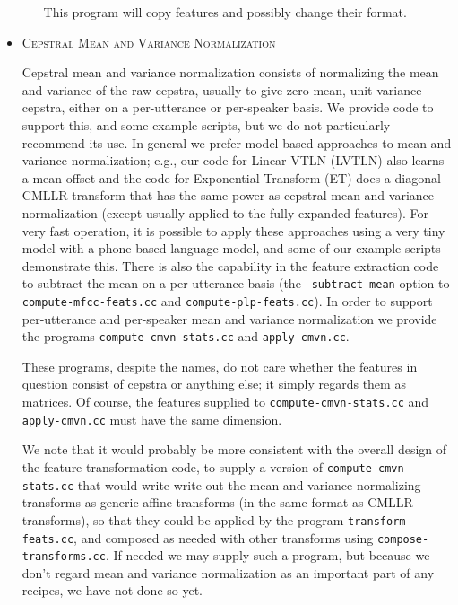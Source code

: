 \documentclass[10pt,a4paper]{article}
\begin{document}
\begin{itemize}
\begin{itemize}
    This program will copy features and possibly change their format.

  \end{itemize}

\vspace{1cm}
\item \textsc{Cepstral Mean and Variance Normalization}

    Cepstral mean and variance normalization consists of normalizing the mean and variance of the raw cepstra, usually to give zero-mean, unit-variance cepstra, either on a per-utterance or per-speaker basis. We provide code to support this, and some example scripts, but we do not particularly recommend its use. In general we prefer model-based approaches to mean and variance normalization; e.g., our code for Linear VTLN (LVTLN) also learns a mean offset and the code for Exponential Transform (ET) does a diagonal CMLLR transform that has the same power as cepstral mean and variance normalization (except usually applied to the fully expanded features). For very fast operation, it is possible to apply these approaches using a very tiny model with a phone-based language model, and some of our example scripts demonstrate this. There is also the capability in the feature extraction code to subtract the mean on a per-utterance basis (the \texttt{--subtract-mean} option to \texttt{compute-mfcc-feats.cc} and \texttt{compute-plp-feats.cc}). In order to support per-utterance and per-speaker mean and variance normalization we provide the programs \texttt{compute-cmvn-stats.cc} and \texttt{apply-cmvn.cc}.

These programs, despite the names, do not care whether the features in question consist of cepstra or anything else; it simply regards them as matrices. Of course, the features supplied to \texttt{compute-cmvn-stats.cc} and \texttt{apply-cmvn.cc} must have the same dimension.

    We note that it would probably be more consistent with the overall design of the feature transformation code, to supply a version of \texttt{compute-cmvn-stats.cc} that would write write out the mean and variance normalizing transforms as generic affine transforms (in the same format as CMLLR transforms), so that they could be applied by the program \texttt{transform-feats.cc}, and composed as needed with other transforms using \texttt{compose-transforms.cc}. If needed we may supply such a program, but because we don't regard mean and variance normalization as an important part of any recipes, we have not done so yet.\\


\end{itemize}
\end{document}
